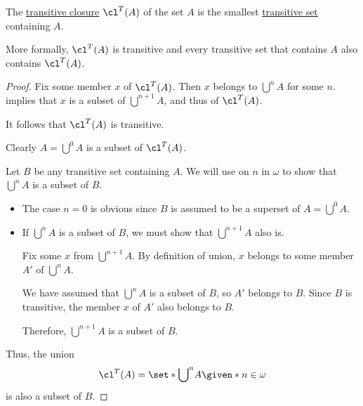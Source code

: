 \begin{proposition}\label{thm:set_transitive_closure}
  The \hyperref[def:set_transitive_closure]{transitive closure} \( \cl^T(A) \) of the set \( A \) is the smallest \hyperref[def:transitive_set]{transitive set} containing \( A \).

  More formally, \( \cl^T(A) \) is transitive and every transitive set that contains \( A \) also contains \( \cl^T(A) \).
\end{proposition}
\begin{proof}
   Fix some member \( x \) of \( \cl^T(A) \). Then \( x \) belongs to \( {\bigcup}^n A \) for some \( n \).  implies that \( x \) is a subset of \( {\bigcup}^{n+1} A \), and thus of \( \cl^T(A) \).

  It follows that \( \cl^T(A) \) is transitive.

   Clearly \( A = {\bigcup}^0 A \) is a subset of \( \cl^T(A) \).

  Let \( B \) be any transitive set containing \( A \). We will use  on \( n \) in \( \omega \) to show that \( \bigcup^n A \) is a subset of \( B \).
  \begin{itemize}
    \item The case \( n = 0 \) is obvious since \( B \) is assumed to be a superset of \( A = {\bigcup}^0 A \).

    \item If \( {\bigcup}^n A \) is a subset of \( B \), we must show that \( {\bigcup}^{n+1} A \) also is.

    Fix some \( x \) from \( {\bigcup}^{n+1} A \). By definition of union, \( x \) belongs to some member \( A' \) of \( {\bigcup}^n A \).

    We have assumed that \( {\bigcup}^n A \) is a subset of \( B \), so \( A' \) belongs to \( B \). Since \( B \) is transitive, the member \( x \) of \( A' \) also belongs to \( B \).

    Therefore, \( {\bigcup}^{n+1} A \) is a subset of \( B \).
  \end{itemize}

  Thus, the union
  \begin{equation*}
    \cl^T(A) = \set*{ {\bigcup}^n A \given* n \in \omega }
  \end{equation*}
  is also a subset of \( B \).
\end{proof}

